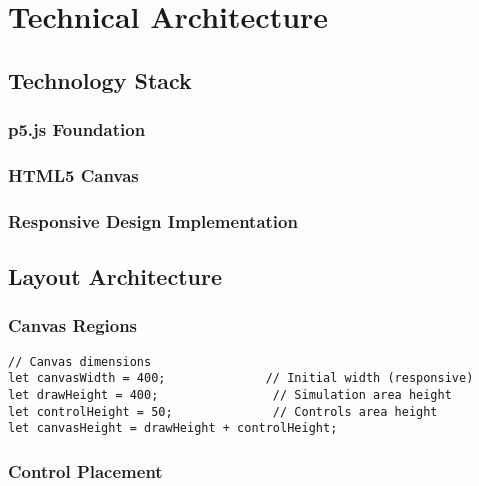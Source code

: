 \section{Technical Architecture}
\label{sec:architecture}


\subsection{Technology Stack}

\subsubsection{p5.js Foundation}

\subsubsection{HTML5 Canvas}

\subsubsection{Responsive Design Implementation}

\subsection{Layout Architecture}

\subsubsection{Canvas Regions}

\begin{lstlisting}[caption={Standard MicroSim Canvas Structure}]
// Canvas dimensions
let canvasWidth = 400;              // Initial width (responsive)
let drawHeight = 400;                // Simulation area height
let controlHeight = 50;              // Controls area height
let canvasHeight = drawHeight + controlHeight;
\end{lstlisting}

\subsubsection{Control Placement}

